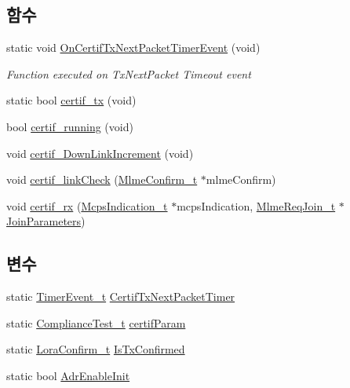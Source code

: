 \subsection*{함수}
\begin{DoxyCompactItemize}
\item 
static void \mbox{\hyperlink{lora-test_8c_a2e3edcd940d4df35743fe87783f89bbc}{On\+Certif\+Tx\+Next\+Packet\+Timer\+Event}} (void)
\begin{DoxyCompactList}\small\item\em Function executed on Tx\+Next\+Packet Timeout event \end{DoxyCompactList}\item 
static bool \mbox{\hyperlink{lora-test_8c_a735361add977554215fd3e1e70b74760}{certif\+\_\+tx}} (void)
\item 
bool \mbox{\hyperlink{lora-test_8c_ae856642063d609fa42633f12c85fa318}{certif\+\_\+running}} (void)
\item 
void \mbox{\hyperlink{lora-test_8c_afd08e01f379119849a415a1d98e44c0d}{certif\+\_\+\+Down\+Link\+Increment}} (void)
\item 
void \mbox{\hyperlink{lora-test_8c_a39763fc2f0d7f70bf980b9508cd7e021}{certif\+\_\+link\+Check}} (\mbox{\hyperlink{group___l_o_r_a_m_a_c_ga73d9d9e11e282a6c258c4d22865fe824}{Mlme\+Confirm\+\_\+t}} $\ast$mlme\+Confirm)
\item 
void \mbox{\hyperlink{lora-test_8c_ad5e51928ecf0cca8d4f33f9e9c10aba4}{certif\+\_\+rx}} (\mbox{\hyperlink{group___l_o_r_a_m_a_c_ga202591b6553d63fae89bd42787496616}{Mcps\+Indication\+\_\+t}} $\ast$mcps\+Indication, \mbox{\hyperlink{group___l_o_r_a_m_a_c_gab12f7f7d9bdfb8067d56f7c9f1297d95}{Mlme\+Req\+Join\+\_\+t}} $\ast$\mbox{\hyperlink{lora_8c_aaa245b1db1384dd6fc0257bc479e760c}{Join\+Parameters}})
\end{DoxyCompactItemize}
\subsection*{변수}
\begin{DoxyCompactItemize}
\item 
static \mbox{\hyperlink{time_server_8h_ae706369dabb8aa6c6075f25119b052a5}{Timer\+Event\+\_\+t}} \mbox{\hyperlink{lora-test_8c_a0c9bb346324d81b31bd460c40b151cdd}{Certif\+Tx\+Next\+Packet\+Timer}}
\item 
static \mbox{\hyperlink{lora-test_8c_a53a6b20274f31e34166b30bb372bb6aa}{Compliance\+Test\+\_\+t}} \mbox{\hyperlink{lora-test_8c_afed64ac962fb28f92cbc92acb72b0b7a}{certif\+Param}}
\item 
static \mbox{\hyperlink{lora_8h_abb50b325793cb04a67bdef9c8c198c20}{Lora\+Confirm\+\_\+t}} \mbox{\hyperlink{lora-test_8c_aeeb75e9eb8da494fe7cbf16abf51427a}{Is\+Tx\+Confirmed}}
\item 
static bool \mbox{\hyperlink{lora-test_8c_ac9f809d4636721961e690fd82f6bafc7}{Adr\+Enable\+Init}}
\end{DoxyCompactItemize}


